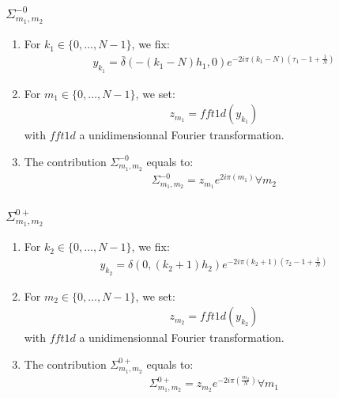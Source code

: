 \subsubsection{$\Sigma_{m_1,m_2}^{-0}$}
\begin{enumerate}
\item For $k_1\in\{0,\hdots,N-1\}$, we fix:
\begin{align*}
y_{k_1}= \bar{\delta}(-(k_1-N)h_1,0)e^{-2i\pi (k_1-N)\left(\tau_1-1+\frac{1}{N}\right)}
\end{align*}
\item For $m_1\in\{0,\hdots,N-1\}$, we set:
\begin{align*}
  z_{m_1}=fft1d(y_{k_1})
\end{align*}
with $fft1d$ a unidimensionnal Fourier transformation.
\item The contribution $\Sigma_{m_1,m_2}^{-0}$ equals to:
\begin{align*}
  \Sigma_{m_1,m_2}^{-0}=z_{m_1}e^{2i\pi\left(m_1\right)} \forall m_2
\end{align*}
\end{enumerate}

\subsubsection{$\Sigma_{m_1,m_2}^{0+}$}
\begin{enumerate}
\item For $k_2\in\{0,\hdots,N-1\}$, we fix:
\begin{align*}
y_{k_2}= \delta(0,(k_2+1)h_2)e^{-2i\pi (k_2+1)\left(\tau_2-1+\frac{1}{N}\right)}
\end{align*}
\item For $m_2\in\{0,\hdots,N-1\}$, we set:
\begin{align*}
  z_{m_2}=fft1d(y_{k_2})
\end{align*}
with $fft1d$ a unidimensionnal Fourier transformation.
\item The contribution $\Sigma_{m_1,m_2}^{0+}$ equals to:
\begin{align*}
  \Sigma_{m_1,m_2}^{0+}=z_{m_2}e^{-2i\pi\left(\frac{m_2}{N}\right)} \forall m_1
\end{align*}
\end{enumerate}

